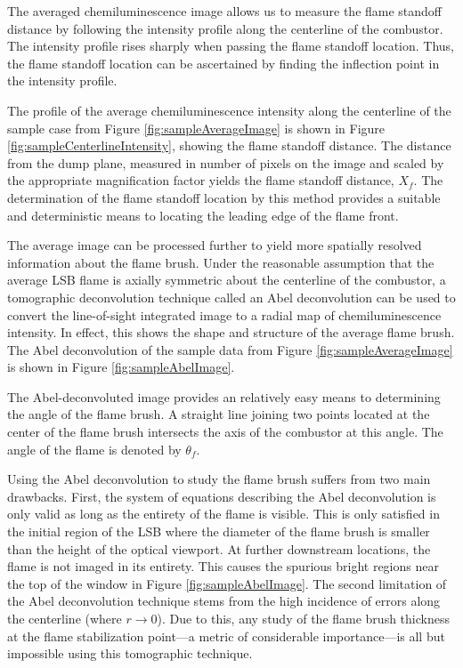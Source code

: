 The averaged chemiluminescence image allows us to measure the flame standoff distance by following the intensity profile along the centerline of the combustor.
The intensity profile rises sharply when passing the flame standoff location.
Thus, the flame standoff location can be ascertained by finding the inflection point in the intensity profile.

The profile of the average chemiluminescence intensity along the centerline of the sample case from Figure \ref{fig:sampleAverageImage} is shown in Figure \ref{fig:sampleCenterlineIntensity}, showing the flame standoff distance.
The distance from the dump plane, measured in number of pixels on the image and scaled by the appropriate magnification factor yields the flame standoff distance, \(X_f\).
The determination of the flame standoff location by this method provides a suitable and deterministic means to locating the leading edge of the flame front.

The average image can be processed further to yield more spatially resolved information about the flame brush.
Under the reasonable assumption that the average LSB flame is axially symmetric about the centerline of the combustor, a tomographic deconvolution technique called an Abel deconvolution\cite{1992-dasch} can be used to convert the line-of-sight integrated image to a radial map of chemiluminescence intensity.
In effect, this shows the shape and structure of the average flame brush.
The Abel deconvolution of the sample data from Figure \ref{fig:sampleAverageImage} is shown in Figure \ref{fig:sampleAbelImage}.

The Abel-deconvoluted image provides an relatively easy means to determining the angle of the flame brush.
A straight line joining two points located at the center of the flame brush intersects the axis of the combustor at this angle.
The angle of the flame is denoted by \(\theta_f\).

Using the Abel deconvolution to study the flame brush suffers from two main drawbacks.
First, the system of equations describing the Abel deconvolution is only valid as long as the entirety of the flame is visible.
This is only satisfied in the initial region of the LSB where the diameter of the flame brush is smaller than the height of the optical viewport.
At further downstream locations, the flame is not imaged in its entirety.
This causes the spurious bright regions near the top of the window in Figure \ref{fig:sampleAbelImage}.
The second limitation of the Abel deconvolution technique stems from the high incidence of errors along the centerline (where \(r \to 0\)).
Due to this, any study of the flame brush thickness at the flame stabilization point---a metric of considerable importance---is all but impossible using this tomographic technique.

